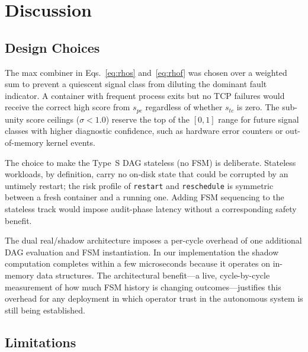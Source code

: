 \documentclass[runningheads]{llncs}
\begin{document}
\section{Discussion}
\label{sec:discussion}

\subsection{Design Choices}

The max combiner in Eqs.~\ref{eq:rhos} and~\ref{eq:rhof} was chosen
over a weighted sum to prevent a quiescent signal class from diluting
the dominant fault indicator. A container with frequent process exits
but no TCP failures would receive the correct high score from $s_{pe}$
regardless of whether $s_{tc}$ is zero. The sub-unity score ceilings
($\sigma < 1.0$) reserve the top of the $[0,1]$ range for future
signal classes with higher diagnostic confidence, such as hardware
error counters or out-of-memory kernel events.

The choice to make the Type~S DAG stateless (no FSM) is deliberate.
Stateless workloads, by definition, carry no on-disk state that could
be corrupted by an untimely restart; the risk profile of
\texttt{restart} and \texttt{reschedule} is symmetric between a fresh
container and a running one. Adding FSM sequencing to the stateless
track would impose audit-phase latency without a corresponding safety
benefit.

The dual real/shadow architecture imposes a per-cycle overhead of one
additional DAG evaluation and FSM instantiation. In our implementation
the shadow computation completes within a few microseconds because it
operates on in-memory data structures. The architectural benefit---a
live, cycle-by-cycle measurement of how much FSM history is changing
outcomes---justifies this overhead for any deployment in which operator
trust in the autonomous system is still being established.

\subsection{Limitations}
\end{document}
